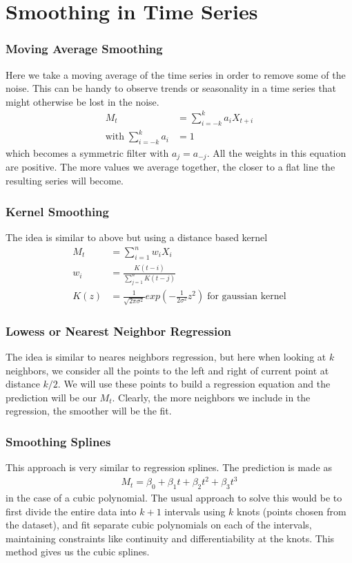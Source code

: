 \documentclass[../../time_series_notes.tex]{subfiles}
\begin{document}
\section{Smoothing in Time Series}
\subsubsection*{Moving Average Smoothing}
Here we take a moving average of the time series in order to remove some of the noise. This can be handy to observe trends or seasonality in a time series that might otherwise be lost in the noise.
\begin{align*}
    M_{t} &= \sum_{i=-k}^{k}a_{i}X_{t+i}\\
    \text{with} \; \sum_{i=-k}^{k}a_{i} &= 1
\end{align*}
which becomes a symmetric filter with $a_{j} = a_{-j}$. All the weights in this equation are positive. The more values we average together, the closer to a flat line the resulting series will become.

\subsubsection*{Kernel Smoothing}
The idea is similar to above but using a distance based kernel
\begin{align*}
    M_{t} &= \sum_{i=1}^{n}w_{i}X_{i}\\
    w_{i} &= \frac{K(t-i)}{\sum_{j=1}^{n}K(t-j)}\\
    K(z) &= \frac{1}{\sqrt{2\pi\sigma^{2}}}exp(-\frac{1}{2\sigma^{2}}z^{2}) \; \text{for gaussian kernel}
\end{align*}


\subsubsection*{Lowess or Nearest Neighbor Regression}
The idea is similar to neares neighbors regression, but here when looking at $k$ neighbors, we consider all the points to the left and right of current point at distance $k/2$. We will use these points to build a regression equation and the prediction will be our $M_{t}$. Clearly, the more neighbors we include in the regression, the smoother will be the fit.

\subsubsection*{Smoothing Splines}
This approach is very similar to regression splines. The prediction is made as
\begin{align*}
    M_{t} = \beta_{0} + \beta_{1}t + \beta_{2}t^{2} + \beta_{3}t^{3}
\end{align*}
in the case of a cubic polynomial. The usual approach to solve this would be to first divide the entire data into $k+1$ intervals using $k$ knots (points chosen from the dataset), and fit separate cubic polynomials on each of the intervals, maintaining constraints like continuity and differentiability at the knots. This method gives us the cubic splines.
\end{document}
